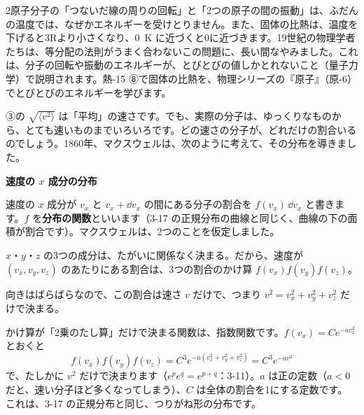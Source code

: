 \begin{seikaku}
2原子分子の「つないだ線の周りの回転」と「2つの原子の間の振動」は、ふだんの温度では、なぜかエネルギーを受けとりません。また、固体の比熱は、温度を下げると3Rより小さくなり、\qty{0}{K} に近づくと0に近づきます。19世紀の物理学者たちは、等分配の法則がうまく合わないこの問題に、長い間なやみました。これは、分子の回転や振動のエネルギーが、とびとびの値しかとれないこと（量子力学）で説明されます。熱-15 ⑧で固体の比熱を、物理シリーズの『原子』（原-6）でとびとびのエネルギーを学びます。
\end{seikaku}


\leavevmode\label{ph:熱-14:sec5}③の $\sqrt{\langle v^2\rangle}$ は「平均」の速さです。でも、実際の分子は、ゆっくりなものから、とても速いものまでいろいろです。どの速さの分子が、どれだけの割合いるのでしょう。1860年、マクスウェルは、次のように考えて、その分布を導きました。

\noindent\textbf{速度の $x$ 成分の分布}\par\nobreak
速度の $x$ 成分が $v_x$ と $v_x+\dd v_x$ の間にある分子の割合を $f(v_x)\,\dd v_x$ と書きます。$f$ を\textbf{分布の関数}といいます（3-17 の正規分布の曲線と同じく、曲線の下の面積が割合です）。マクスウェルは、2つのことを仮定しました。
\begin{enumerate}[label={\bkcircled[bkBlue]{\arabic*}}, leftmargin=2.4\zw, itemsep=2pt, topsep=2pt]
\item $x$・$y$・$z$ の3つの成分は、たがいに関係なく決まる。だから、速度が $(v_x,v_y,v_z)$ のあたりにある割合は、3つの割合のかけ算 $f(v_x)f(v_y)f(v_z)$。
\item 向きはばらばらなので、この割合は速さ $v$ だけで、つまり $v^2=v_x^2+v_y^2+v_z^2$ だけで決まる。
\end{enumerate}
かけ算が「2乗のたし算」だけで決まる関数は、指数関数です。$f(v_x)=Ce^{-av_x^2}$ とおくと
\[ f(v_x)f(v_y)f(v_z)=C^3e^{-a(v_x^2+v_y^2+v_z^2)}=C^3e^{-av^2} \]
で、たしかに $v^2$ だけで決まります（$e^{p}e^{q}=e^{p+q}$：3-11）。$a$ は正の定数（$a<0$ だと、速い分子ほど多くなってしまう）、$C$ は全体の割合を1にする定数です。
\label{ph:熱-14:maxwell1}これは、3-17 の正規分布と同じ、つりがね形の分布です。

